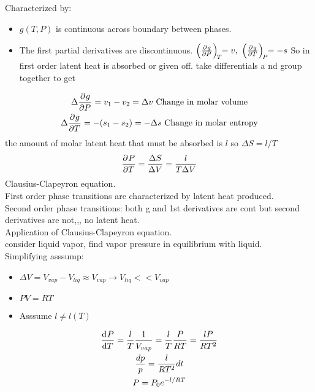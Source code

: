 \documentclass{article}
\begin{document}
Characterized by: 
\begin{itemize}
    \item $g(T,P)$ is continuous across boundary between phases. 
    \item The first partial derivatives are discontinuous. $\pder{g}{P}[T]=v,\ \pder{g}{T}[P]=-s$ 
    So in first order latent heat is absorbed or given off. 
    take differentials a nd group together to get 
\end{itemize}
\begin{gather*}
    \Delta\pder{g}{P}=v_1-v_2=\Delta v\ \text{Change in molar volume}
    \\
    \Delta\pder{g}{T}=-(s_1-s_2)=-\Delta s\ \text{Change in molar entropy}
\end{gather*}
the amount of molar latent heat that must be absorbed is $l$ so $\Delta S=l/T$
$$\pder{P}{T}=\frac{\Delta S}{\Delta V}=\frac{l}{T\Delta V}$$
Clausius-Clapeyron equation. \\
First order phase transitions are characterized by latent heat produced. \\
Second order phase transitions: both g and 1st derivatives are cont but second derivatives are not,,, no latent heat. 
\\
Application of Clausius-Clapeyron equation. \\
consider liquid vapor, find vapor pressure in equilibrium with liquid. \\
Simplifying asssump: 
\begin{itemize}
    \item $\Delta V=V_{vap}-V_{liq}\approx V_{vap}\rightarrow V_{liq}<<V_{vap}$
    \item $PV=RT$
    \item Asssume $l\neq l(T)$
\end{itemize}
\begin{gather*}
    \der{P}{T}=\frac{l}{T}\oo{V_{vap}}=\frac{l}{T}\frac{P}{RT}=\frac{lP}{RT^2}
    \\
    \oo[dp]{p}=\frac{l}{RT^2}dt
    \\
    P=P_0e^{-l/RT}
\end{gather*}
\end{document}
